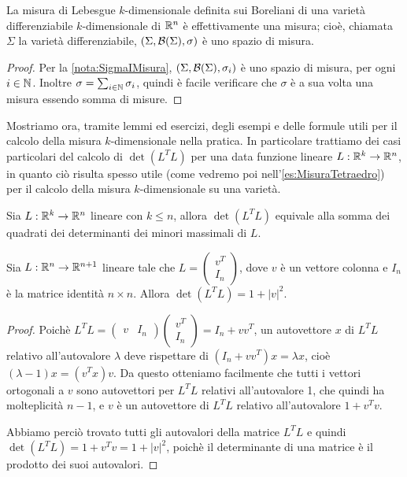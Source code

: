 \begin{theorem}
	La misura di Lebesgue $k$-dimensionale definita sui Boreliani di una varietà differenziabile $k$-dimensionale di $\mathbb R^n$ è effettivamente una misura; cioè, chiamata $\Sigma$ la varietà differenziabile, $(\Sigma,\mathcal B(\Sigma),\sigma)$ è uno spazio di misura.
\end{theorem}
\begin{proof}
	Per la \cref{nota:SigmaIMisura}, $(\Sigma,\mathcal B(\Sigma),\sigma_i)$ è uno spazio di misura, per ogni $i\in\mathbb N$. Inoltre $\sigma=\sum_{i\in\mathbb N}\sigma_i$, quindi è facile verificare che $\sigma$ è a sua volta una misura essendo somma di misure.
\end{proof}

Mostriamo ora, tramite lemmi ed esercizi, degli esempi e delle formule utili per il calcolo della misura $k$-dimensionale nella pratica. In particolare trattiamo dei casi particolari del calcolo di $\det(L^TL)$ per una data funzione lineare $L:\mathbb R^k\to\mathbb R^n$, in quanto ciò risulta spesso utile (come vedremo poi nell'\cref{es:MisuraTetraedro}) per il calcolo della misura $k$-dimensionale su una varietà.

\begin{exercise}\label{es:DeterminanteProdottoTrasposta}
	Sia $L:\mathbb R^k\to\mathbb R^n$ lineare con $k\le n$, allora $\det(L^TL)$ equivale alla somma dei quadrati dei determinanti dei minori massimali di $L$.
\end{exercise}

\begin{lemma}\label{lemma:DeterminanteMatriceQuasiIdentita}
	Sia $L:\mathbb R^n\to\mathbb R^{n+1}$ lineare tale che $L=\begin{pmatrix} v^T \\ I_n \end{pmatrix}$, dove $v$ è un vettore colonna e $I_n$ è la matrice identità $n\times n$. Allora $\det(L^TL)=1+\lvert v \rvert ^2$.
\end{lemma}
\begin{proof}
	Poichè $L^TL=\begin{pmatrix} v & I_n \end{pmatrix}\begin{pmatrix} v^T \\ I_n \end{pmatrix}=I_n+vv^T$, un autovettore $x$ di $L^TL$ relativo all'autovalore $\lambda$ deve rispettare di $(I_n+vv^T)x=\lambda x$, cioè $(\lambda-1)x=(v^Tx)v$. Da questo otteniamo facilmente che tutti i vettori ortogonali a $v$ sono autovettori per $L^TL$ relativi all'autovalore 1, che quindi ha molteplicità $n-1$, e $v$ è un autovettore di $L^TL$ relativo all'autovalore $1+v^Tv$.
	
	Abbiamo perciò trovato tutti gli autovalori della matrice $L^TL$ e quindi $\det(L^TL)=1+v^Tv=1+\lvert v \rvert ^2$, poichè il determinante di una matrice è il prodotto dei suoi autovalori.
\end{proof}

